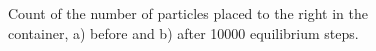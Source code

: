 \documentclass{article}
\begin{document}
\begin{figure}[htb]
  \label{fig:partdist}
  \caption{
     Count of the number of particles placed to the right in the container, a) before and b) after 10000 equilibrium steps.
  }
\end{figure}



\end{document}
